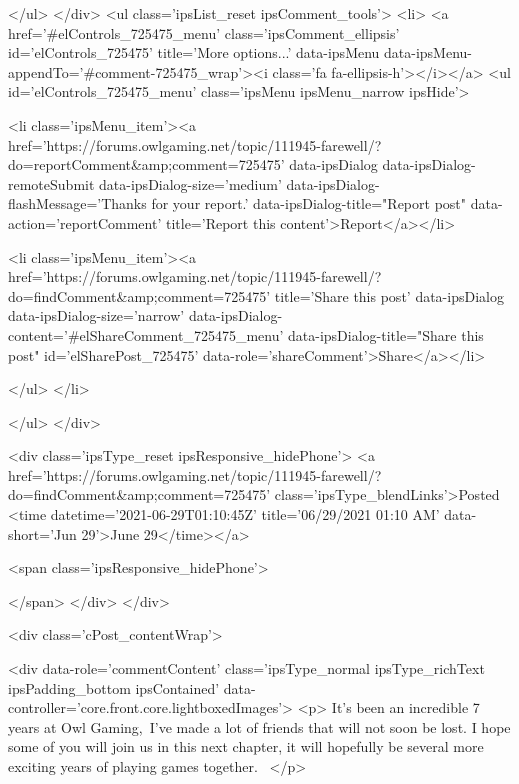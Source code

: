 				</ul>
			</div>
			<ul class='ipsList_reset ipsComment_tools'>
				<li>
					<a href='#elControls_725475_menu' class='ipsComment_ellipsis' id='elControls_725475' title='More options...' data-ipsMenu data-ipsMenu-appendTo='#comment-725475_wrap'><i class='fa fa-ellipsis-h'></i></a>
					<ul id='elControls_725475_menu' class='ipsMenu ipsMenu_narrow ipsHide'>
						
							<li class='ipsMenu_item'><a href='https://forums.owlgaming.net/topic/111945-farewell/?do=reportComment&amp;comment=725475' data-ipsDialog data-ipsDialog-remoteSubmit data-ipsDialog-size='medium' data-ipsDialog-flashMessage='Thanks for your report.' data-ipsDialog-title="Report post" data-action='reportComment' title='Report this content'>Report</a></li>
						
						
							<li class='ipsMenu_item'><a href='https://forums.owlgaming.net/topic/111945-farewell/?do=findComment&amp;comment=725475' title='Share this post' data-ipsDialog data-ipsDialog-size='narrow' data-ipsDialog-content='#elShareComment_725475_menu' data-ipsDialog-title="Share this post" id='elSharePost_725475' data-role='shareComment'>Share</a></li>
						
                        
						
						
						
							
								
							
							
							
							
							
							
						
					</ul>
				</li>
				
			</ul>
		</div>

		<div class='ipsType_reset ipsResponsive_hidePhone'>
			<a href='https://forums.owlgaming.net/topic/111945-farewell/?do=findComment&amp;comment=725475' class='ipsType_blendLinks'>Posted <time datetime='2021-06-29T01:10:45Z' title='06/29/2021 01:10  AM' data-short='Jun 29'>June 29</time></a> 
			
			<span class='ipsResponsive_hidePhone'>
				
				
			</span>
		</div>
	</div>

	

    

	<div class='cPost_contentWrap'>
		
		<div data-role='commentContent' class='ipsType_normal ipsType_richText ipsPadding_bottom ipsContained' data-controller='core.front.core.lightboxedImages'>
			<p>
	It's been an incredible 7 years at Owl Gaming, I've made a lot of friends that will not soon be lost. I hope some of you will join us in this next chapter, it will hopefully be several more exciting years of playing games together. 
</p>

